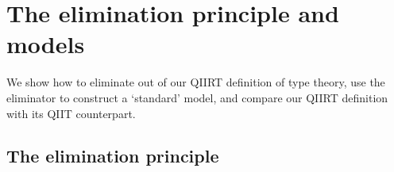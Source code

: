 \documentclass[a4paper,UKenglish,numberwithinsect,cleveref,thm-restate]{lipics-v2021}
\newcommand{\LT}[2][]{\todo[inline,author={L-T},caption={},color={pink},#1]{#2}}
\begin{document}

\section{The elimination principle and models} \label{sec:models}

We show how to eliminate out of our QIIRT definition of type theory,
use the eliminator to construct a `standard' model,
and compare our QIIRT definition with its QIIT counterpart.

\subsection{The elimination principle} \label{subsec:eliminator}
\end{document}
